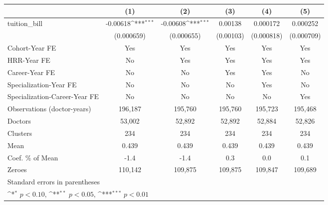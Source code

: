 {
\def\sym#1{\ifmmode^{#1}\else\(^{#1}\)\fi}
\begin{tabular}{l*{5}{c}}
\hline\hline
                    &\multicolumn{1}{c}{(1)}         &\multicolumn{1}{c}{(2)}         &\multicolumn{1}{c}{(3)}         &\multicolumn{1}{c}{(4)}         &\multicolumn{1}{c}{(5)}         \\
\hline
tuition\_bill        &    -0.00618\sym{***}&    -0.00608\sym{***}&     0.00138         &    0.000172         &    0.000252         \\
                    &  (0.000659)         &  (0.000655)         &   (0.00103)         &  (0.000818)         &  (0.000709)         \\
[1em]
Cohort-Year FE      &         Yes         &         Yes         &         Yes         &         Yes         &         Yes         \\
[1em]
HRR-Year FE         &          No         &         Yes         &         Yes         &         Yes         &         Yes         \\
[1em]
Career-Year FE      &          No         &          No         &         Yes         &         Yes         &          No         \\
[1em]
Specialization-Year FE&          No         &          No         &          No         &         Yes         &          No         \\
[1em]
Specialization-Career-Year FE&          No         &          No         &          No         &          No         &         Yes         \\
\hline
Observations (doctor-years)&     196,187         &     195,760         &     195,760         &     195,723         &     195,468         \\
Doctors             &      53,002         &      52,892         &      52,892         &      52,884         &      52,826         \\
Clusters            &         234         &         234         &         234         &         234         &         234         \\
Mean                &       0.439         &       0.439         &       0.439         &       0.439         &       0.439         \\
Coef. \% of Mean    &        -1.4         &        -1.4         &         0.3         &         0.0         &         0.1         \\
Zeroes              &     110,142         &     109,875         &     109,875         &     109,847         &     109,689         \\
\hline\hline
\multicolumn{6}{l}{\footnotesize Standard errors in parentheses}\\
\multicolumn{6}{l}{\footnotesize \sym{*} \(p<0.10\), \sym{**} \(p<0.05\), \sym{***} \(p<0.01\)}\\
\end{tabular}
}
